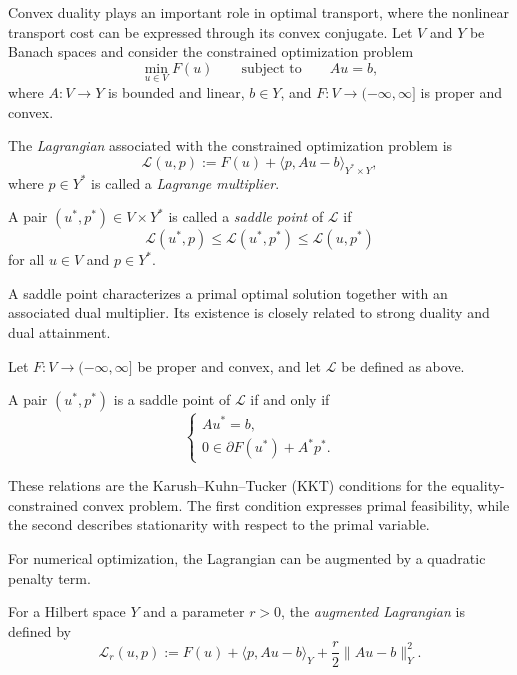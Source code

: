 Convex duality plays an important role in
optimal transport, where the nonlinear
transport cost can be expressed through
its convex conjugate.
Let $V$ and $Y$ be Banach spaces and consider the constrained optimization problem
\[
    \min_{u\in V}F(u)
    \qquad\text{subject to}\qquad Au=b,
\]
where $A:V\to Y$ is bounded and linear,
$b\in Y$, and $F:V\to(-\infty,\infty]$ is proper and convex.

\begin{definition}[Lagrangian]
    The \emph{Lagrangian} associated with
    the constrained optimization problem is
    \[
        \mathcal{L}(u,p)
        :=
        F(u)+\langle p,Au-b\rangle_{Y^*\times Y},
    \]
    where $p\in Y^*$ is called a
    \emph{Lagrange multiplier}.
\end{definition}

\begin{definition}
    A pair $(u^*,p^*)\in V\times Y^*$
    is called a \emph{saddle point} of
    $\mathcal{L}$ if
    \[
        \mathcal{L}(u^*,p)
        \leq \mathcal{L}(u^*,p^*)
        \leq \mathcal{L}(u,p^*)
    \]
    for all $u\in V$ and $p\in Y^*$.
\end{definition}

A saddle point characterizes a primal
optimal solution together with an
associated dual multiplier. Its existence
is closely related to strong duality and
dual attainment.

\begin{theorem}
    Let $F:V\to(-\infty,\infty]$ be
    proper and convex, and let
    $\mathcal{L}$ be defined as above.

    A pair $(u^*,p^*)$ is a saddle point
    of $\mathcal{L}$ if and only if
    \[
        \begin{cases}
            Au^*=b,\\[2mm]
            0\in\partial F(u^*)+A^*p^*.
        \end{cases}
    \]
\end{theorem}

These relations are the Karush--Kuhn--Tucker
(KKT) conditions for the equality-constrained
convex problem. The first condition expresses
primal feasibility, while the second describes
stationarity with respect to the primal
variable.

For numerical optimization, the Lagrangian
can be augmented by a quadratic penalty term.

\begin{definition}
    For a Hilbert space $Y$ and a parameter
    $r>0$, the \emph{augmented Lagrangian}
    is defined by
    \[
        \mathcal{L}_r(u,p)
        :=
        F(u)
        +\langle p,Au-b\rangle_Y
        +\frac{r}{2}\|Au-b\|_Y^2.
    \]
\end{definition}

